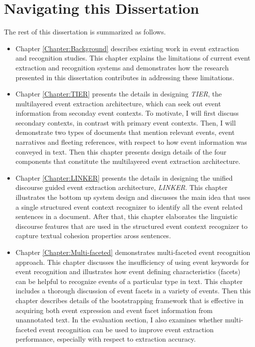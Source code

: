 \section{Navigating this Dissertation}
The rest of this dissertation is summarized as follows. 
  \begin{itemize}
   \item Chapter \ref{Chapter:Background} describes existing work in event extraction and recognition studies.
This chapter explains the limitations of current event extraction and recognition systems 
and demonstrates how the research presented in this dissertation contributes in addressing these limitations. 

   \item Chapter \ref{Chapter:TIER} presents the details in designing
   {\it TIER}, 
the multilayered event extraction architecture, which can seek out event information 
from seconday event contexts. To motivate, I will first discuss 
secondary contexts, in contrast with primary event contexts. 
Then, I will demonstrate two types of documents that mention relevant events,  
event narratives and fleeting references, 
with respect to how event information was conveyed in text.  
Then this chapter presents design 
details of the four components 
that constitute the multilayered event extraction architecture. 
  

   \item Chapter \ref{Chapter:LINKER} presents the details in designing 
   the unified 
discourse guided event extraction architecture, {\it LINKER}. This chapter illustrates 
the bottom up system design and discusses the main idea that 
uses a single structured event context 
recognizer to identify all the event related sentences in a document. 
After that, this chapter elaborates the linguistic discourse features that are used in the 
structured event context recognizer to 
capture textual cohesion properties aross sentences.


   \item Chapter \ref{Chapter:Multi-faceted} demonstrates multi-faceted event recognition approach. This chapter 
discusses the insufficiency of using event keywords for event recognition and 
illustrates how event defining characteristics (facets) can be helpful to recognize events of a particular type in text.
This chapter includes a thorough discussion of event facets in a variety of events. 
Then this chapter describes details of the bootstrapping framework that is effective in 
acquiring both event expression and event facet information from unannotated text. 
In the evaluation section, I also examines whether 
multi-faceted event recognition 
can be used to improve event extraction performance, 
especially with respect to extraction accuracy. 


\end{itemize}
